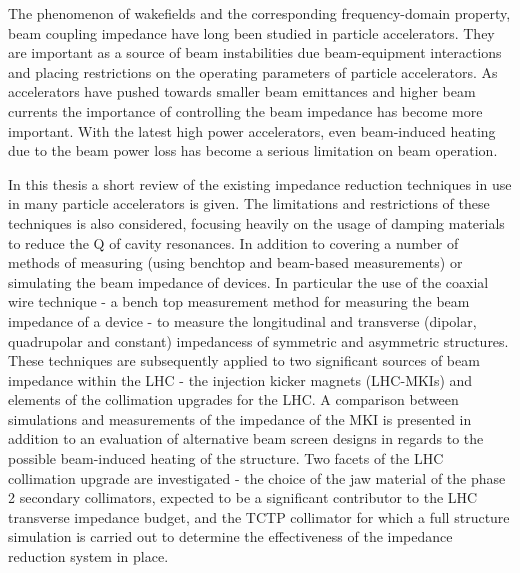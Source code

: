 The phenomenon of wakefields and the corresponding frequency-domain property, beam coupling impedance have long been studied in particle accelerators. They are important as a source of beam instabilities due beam-equipment interactions and placing restrictions on the operating parameters of particle accelerators. As accelerators have pushed towards smaller beam emittances and higher beam currents the importance of controlling the beam impedance has become more important. With the latest high power accelerators, even beam-induced heating due to the beam power loss has become a serious limitation on beam operation.

In this thesis a short review of the existing impedance reduction techniques in use in many particle accelerators is given. The limitations and restrictions of these techniques is also considered, focusing heavily on the usage of damping materials to reduce the Q of cavity resonances. In addition to covering a number of methods of measuring (using benchtop and beam-based measurements) or simulating the beam impedance of devices. In particular the use of the coaxial wire technique - a bench top measurement method for measuring the beam impedance of a device - to measure the longitudinal and transverse (dipolar, quadrupolar and constant) impedancess of symmetric and asymmetric structures. These techniques are subsequently applied to two significant sources of beam impedance within the LHC - the injection kicker magnets (LHC-MKIs) and elements of the collimation upgrades for the LHC. A comparison between simulations and measurements of the impedance of the MKI is presented in addition to an evaluation of alternative beam screen designs in regards to the possible beam-induced heating of the structure. Two facets of the LHC collimation upgrade are investigated - the choice of the jaw material of the phase 2 secondary collimators, expected to be a significant contributor to the LHC transverse impedance budget, and the TCTP collimator for which a full structure simulation is carried out to determine the effectiveness of the impedance reduction system in place.